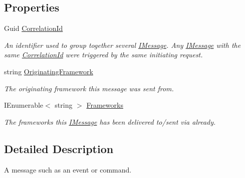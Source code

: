 \subsection*{Properties}
\begin{DoxyCompactItemize}
\item 
Guid \hyperlink{interfaceCqrs_1_1Messages_1_1IMessage_a9037d871a75ac76b190130aa56fe63a8_a9037d871a75ac76b190130aa56fe63a8}{Correlation\+Id}
\begin{DoxyCompactList}\small\item\em An identifier used to group together several \hyperlink{interfaceCqrs_1_1Messages_1_1IMessage}{I\+Message}. Any \hyperlink{interfaceCqrs_1_1Messages_1_1IMessage}{I\+Message} with the same \hyperlink{interfaceCqrs_1_1Messages_1_1IMessage_a9037d871a75ac76b190130aa56fe63a8_a9037d871a75ac76b190130aa56fe63a8}{Correlation\+Id} were triggered by the same initiating request. \end{DoxyCompactList}\item 
string \hyperlink{interfaceCqrs_1_1Messages_1_1IMessage_aff9a2d35971384fb440954c3163eaeef_aff9a2d35971384fb440954c3163eaeef}{Originating\+Framework}
\begin{DoxyCompactList}\small\item\em The originating framework this message was sent from. \end{DoxyCompactList}\item 
I\+Enumerable$<$ string $>$ \hyperlink{interfaceCqrs_1_1Messages_1_1IMessage_af147de5bb9a480ba75b5bb9f0ef12132_af147de5bb9a480ba75b5bb9f0ef12132}{Frameworks}
\begin{DoxyCompactList}\small\item\em The frameworks this \hyperlink{interfaceCqrs_1_1Messages_1_1IMessage}{I\+Message} has been delivered to/sent via already. \end{DoxyCompactList}\end{DoxyCompactItemize}


\subsection{Detailed Description}
A message such as an event or command. 



